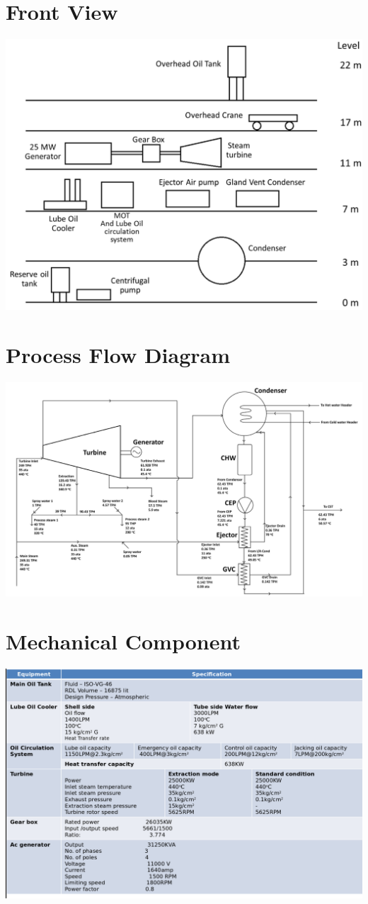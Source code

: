 \documentclass[english,11pt]{report}
\begin{document}
\section{Front View}
\includegraphics[width = 6in]{stgfront.png}

\section{Process Flow Diagram}
\includegraphics[width =6in]{stgprocessflow.png}

\section{Mechanical Component}
\includegraphics[width =6in]{stgmech.png}
\end{document}
